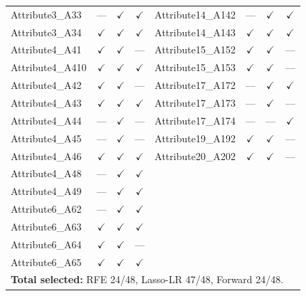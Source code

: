 \begin{table}[H]
\begin{tabular}{l c c c | l c c c}
Attribute3\_A33     & ---          & $\checkmark$ & $\checkmark$ & Attribute14\_A142 & ---         & $\checkmark$ & $\checkmark$\\
Attribute3\_A34     & $\checkmark$ & $\checkmark$ & $\checkmark$ & Attribute14\_A143 & $\checkmark$ & $\checkmark$ & $\checkmark$\\
Attribute4\_A41     & $\checkmark$ & $\checkmark$ & ---          & Attribute15\_A152 & $\checkmark$ & $\checkmark$ & ---\\
Attribute4\_A410    & $\checkmark$ & $\checkmark$ & $\checkmark$ & Attribute15\_A153 & $\checkmark$ & $\checkmark$ & ---\\
Attribute4\_A42     & $\checkmark$ & $\checkmark$ & ---          & Attribute17\_A172 & ---         & $\checkmark$ & $\checkmark$\\
Attribute4\_A43     & $\checkmark$ & $\checkmark$ & $\checkmark$ & Attribute17\_A173 & ---         & $\checkmark$ & ---\\
Attribute4\_A44     & ---          & $\checkmark$ & ---          & Attribute17\_A174 & ---         & ---          & $\checkmark$\\
Attribute4\_A45     & ---          & $\checkmark$ & ---          & Attribute19\_A192 & $\checkmark$ & $\checkmark$ & ---\\
Attribute4\_A46     & $\checkmark$ & $\checkmark$ & $\checkmark$ & Attribute20\_A202 & $\checkmark$ & $\checkmark$ & ---\\
Attribute4\_A48     & ---          & $\checkmark$ & $\checkmark$ & \multicolumn{4}{l}{}\\
Attribute4\_A49     & ---          & $\checkmark$ & $\checkmark$ & \multicolumn{4}{l}{}\\
Attribute6\_A62     & ---          & $\checkmark$ & $\checkmark$ & \multicolumn{4}{l}{}\\
Attribute6\_A63     & $\checkmark$ & $\checkmark$ & $\checkmark$ & \multicolumn{4}{l}{}\\
Attribute6\_A64     & $\checkmark$ & $\checkmark$ & ---          & \multicolumn{4}{l}{}\\
Attribute6\_A65     & $\checkmark$ & $\checkmark$ & $\checkmark$ & \multicolumn{4}{l}{}\\
\midrule
\multicolumn{8}{l}{\textbf{Total selected:} RFE 24/48, Lasso-LR 47/48, Forward 24/48.}\\
\bottomrule
\end{tabular}
\end{table}

